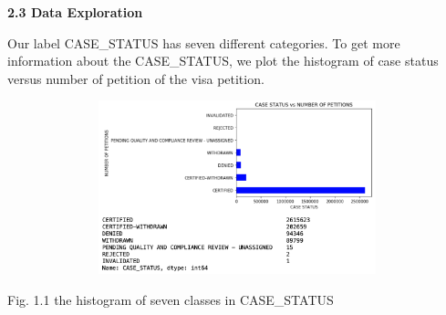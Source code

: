 \documentclass[12pt]{article}
\begin{document}
\begin{justify}
\textbf{2.3 Data Exploration}
\end{justify}\par

\begin{justify}
Our label CASE\_STATUS has seven different categories. To get more information about the CASE\_STATUS, we plot the histogram of case status versus number of petition of the visa petition. 
\end{justify}\par




\begin{figure}[H]
	\begin{Center}
		\includegraphics[width=4.89in,height=1.98in]{./media/image2.png}
	\end{Center}
\end{figure}



\par

\begin{Center}
{\fontsize{8pt}{9.6pt}\selectfont Fig. 1.1 the histogram of seven classes in CASE\_STATUS\par}
\end{Center}\par


\vspace{\baselineskip}


\end{document}

